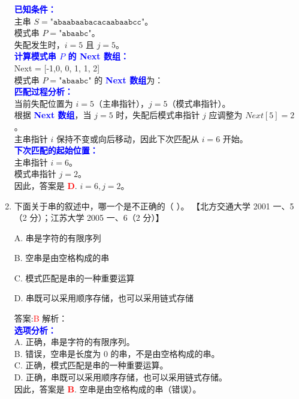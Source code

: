 \documentclass[lang=cn,newtx,10pt,scheme=chinese]{../../../elegantbook}
\begin{document}
\begin{enumerate}
    \textbf{\textcolor{blue}{已知条件：}}\\
    主串 $S = \texttt{"abaabaabacacaabaabcc"}$。\\
    模式串 $P = \texttt{"abaabc"}$。\\
    失配发生时，$i = 5$ 且 $j = 5$。\\

    \textbf{\textcolor{blue}{计算模式串 $P$ 的 Next 数组：}}\\

    Next = [-1,0, 0, 1, 1, 2]\\

    模式串 $P = \texttt{"abaabc"}$ 的 \textbf{\textcolor{blue}{Next 数组}}为：\\

    \textbf{\textcolor{blue}{匹配过程分析：}}\\
    当前失配位置为 $i = 5$（主串指针），$j = 5$（模式串指针）。\\
    根据 \textbf{\textcolor{blue}{Next 数组}}，当 $j = 5$ 时，失配后模式串指针 $j$ 应调整为 $Next[5] = 2$。\\
    主串指针 $i$ 保持不变或向后移动，因此下次匹配从 $i = 6$ 开始。\\

    \textbf{\textcolor{blue}{下次匹配的起始位置：}}\\
    主串指针 $i = 6$。\\
    模式串指针 $j = 2$。\\

    因此，答案是 \textbf{\textcolor{red}{D}}. $i=6, j=2$。

    \item 下面关于串的叙述中，哪一个是不正确的（ ）。  
    【北方交通大学 2001 一、5（2 分）；江苏大学 2005 一、6（2 分）】  

    A. 串是字符的有限序列  

    B. 空串是由空格构成的串  

    C. 模式匹配是串的一种重要运算 

    D. 串既可以采用顺序存储，也可以采用链式存储  

    答案:\textcolor{red}{B}
    解析：\\
    \textbf{\textcolor{blue}{选项分析：}}\\
    A. 正确，串是字符的有限序列。\\
    B. 错误，空串是长度为 0 的串，不是由空格构成的串。\\
    C. 正确，模式匹配是串的一种重要运算。\\
    D. 正确，串既可以采用顺序存储，也可以采用链式存储。\\
    因此，答案是 \textbf{\textcolor{red}{B}}. 空串是由空格构成的串（错误）。\\


\end{enumerate}
\end{document}
